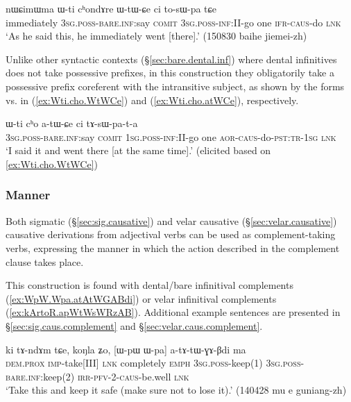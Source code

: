 \begin{exe} 
\ex \label{ex:Wti.cho.WtWCe}  
\gll  nɯɕimɯma ɯ-ti cʰondɤre ɯ-tɯ-ɕe ci to-sɯ-pa tɕe \\
immediately \textsc{3sg}.\textsc{poss}-\textsc{bare}.\textsc{inf}:say \textsc{comit} \textsc{3sg}.\textsc{poss}-\textsc{inf}:\textsc{II}-go  one \textsc{ifr}-\textsc{caus}-do \textsc{lnk} \\
\glt `As he said this, he immediately went [there].' (150830 baihe jiemei-zh)
\end{exe} 

Unlike other syntactic contexts (§\ref{sec:bare.dental.inf}) where dental infinitives does not take possessive prefixes, in this construction they obligatorily take a possessive prefix coreferent with the intransitive subject, as shown by the forms  vs.  in (\ref{ex:Wti.cho.WtWCe}) and (\ref{ex:Wti.cho.atWCe}), respectively.

\begin{exe} 
\ex \label{ex:Wti.cho.atWCe}
\gll   ɯ-ti cʰo a-tɯ-ɕe ci tɤ-sɯ-pa-t-a  \\
\textsc{3sg}.\textsc{poss}-\textsc{bare}.\textsc{inf}:say \textsc{comit} \textsc{1sg}.\textsc{poss}-\textsc{inf}:\textsc{II}-go  one  \textsc{aor}-\textsc{caus}-do-\textsc{pst}:\textsc{tr}-\textsc{1sg} \textsc{lnk} \\
\glt `I said it and went there [at the same time].' (elicited based on \ref{ex:Wti.cho.WtWCe})
\end{exe} 

\subsubsection{Manner} \label{sec:causative.manner.complement}
Both sigmatic (§\ref{sec:sig.causative}) and velar causative (§\ref{sec:velar.causative}) causative derivations from adjectival verbs can be used as com\-ple\-ment-taking verbs, expressing the manner in which the action described in the complement clause takes place.


This construction is found with dental/bare infinitival complements (\ref{ex:WpW.Wpa.atAtWGABdi}) or velar infinitival complements (\ref{ex:kArtoR.apWtWsWRzAB}). Additional example sentences are presented in §\ref{sec:sig.caus.complement} and §\ref{sec:velar.caus.complement}. 

\begin{exe} 
\ex \label{ex:WpW.Wpa.atAtWGABdi}
\gll ki tɤ-ndɤm tɕe, koŋla ʑo, [ɯ-pɯ ɯ-pa] a-tɤ-tɯ-ɣɤ-βdi ma  \\
\textsc{dem}.\textsc{prox} \textsc{imp}-take[III] \textsc{lnk} completely \textsc{emph} \textsc{3sg}.\textsc{poss}-keep(1) \textsc{3sg}.\textsc{poss}-\textsc{bare}.\textsc{inf}:keep(2) \textsc{irr}-\textsc{pfv}-2-\textsc{caus}-be.well \textsc{lnk} \\
\glt `Take this and keep it safe (make sure not to lose it).' (140428 mu e guniang-zh)
\end{exe} 


